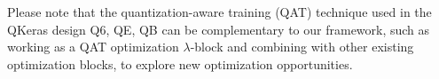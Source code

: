 Please note that the quantization-aware training (QAT) technique used in the QKeras design Q6, QE, QB can be complementary to our framework, such as working as a QAT optimization $\lambda$-block and combining with other existing optimization blocks, to explore new optimization opportunities. 






